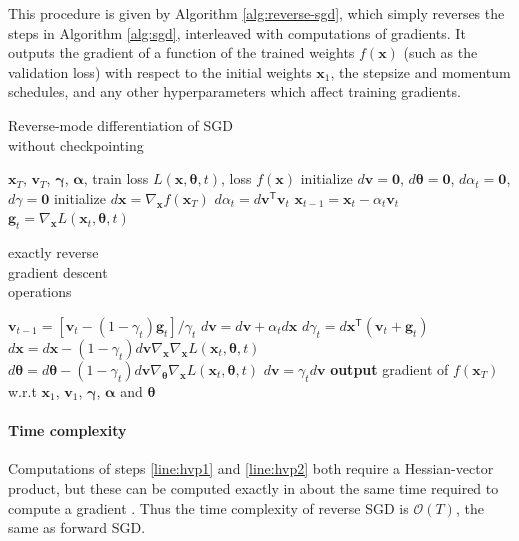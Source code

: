\documentclass{article}
\newcommand{\vx}{\mathbf{x}}
\newcommand{\vv}{\mathbf{v}}
\newcommand{\vg}{\mathbf{g}}
\newcommand{\vzero}{\mathbf{0}}
\newcommand{\tra}{^{\mathsf{T}}}
\newcommand{\hypers}{{\boldsymbol{\theta}}}
\newcommand{\params}{\vx}
\newcommand{\decay}{\gamma}
\newcommand{\decays}{{\boldsymbol{\decay}}}
\newcommand{\stepsize}{\alpha}
\newcommand{\stepsizes}{{\boldsymbol{\stepsize}}}
\newcommand{\gradparams}{\nabla_\params L(\params_t, \hypers, t)}
\begin{document}
This procedure is given by Algorithm \ref{alg:reverse-sgd}, which simply reverses the steps in Algorithm \ref{alg:sgd}, interleaved with computations of gradients.
It outputs the gradient of a function of the trained weights $f(\vx)$ (such as the validation loss) with respect to the initial weights $\vx_1$, the stepsize and momentum schedules, and any other hyperparameters which affect training gradients.
%
\begin{algorithm}
   \caption{Reverse-mode differentiation of SGD \\ without checkpointing}
   \label{alg:reverse-sgd}
\begin{algorithmic}[1]
    $\vx_T$, $\vv_T$, $\decays$, $\stepsizes$, train loss $L(\params, \hypers, t)$, loss $f(\params)$
   \State initialize $d\vv = \vzero$, $d\hypers = \vzero$, $d\stepsize_t = \vzero$, $d\decay = \vzero$
   \State initialize $d\vx = \nabla_\params f(\params_T)$
   \State $d\stepsize_t = d\vv\tra \vv_t$
   \State $\vx_{t-1} = \vx_t - \stepsize_t \vv_t$ \label{step:reverse-position}
   \vspace{-0.95\baselineskip}
   \State $\vg_t = \gradparams$ \label{step:reverse-gradient}
   \hfill \scalebox{1.1}{\Bigg\}} \vspace{-\baselineskip} \begin{minipage}{2.5cm} exactly reverse \\ gradient descent \\ operations \strut \end{minipage}
   \State $\vv_{t-1} = [\vv_t - (1 - \decay_t) \vg_t] / \decay_t$ \label{step:reverse-velocity}
   \State $d\vv = d\vv + \stepsize_t d\vx$
   \State $d\decay_t = d\vx\tra (\vv_t + \vg_t)$
   \State $d\vx = d\vx - (1 - \decay_t) d\vv \nabla_\params \gradparams$ \label{line:hvp1}
   \State $d\hypers = d\hypers - (1 - \decay_t) d\vv \nabla_\hypers \gradparams$ \label{line:hvp2}
   \State $d\vv = \decay_t d\vv$
   \EndFor
   \State \textbf{output} gradient of $f(\vx_T)$ w.r.t $\vx_1$, $\vv_1$, $\decays$, $\stepsizes$ and $\hypers$
\end{algorithmic}
\end{algorithm}
%

\paragraph{Time complexity}
Computations of steps \ref{line:hvp1} and \ref{line:hvp2} both require a Hessian-vector product, but these can be computed exactly in about the same time required to compute a gradient \citep{pearlmutter1994fast}.
Thus the time complexity of reverse SGD is $\mathcal{O}(T)$, the same as forward SGD.
\end{document}
